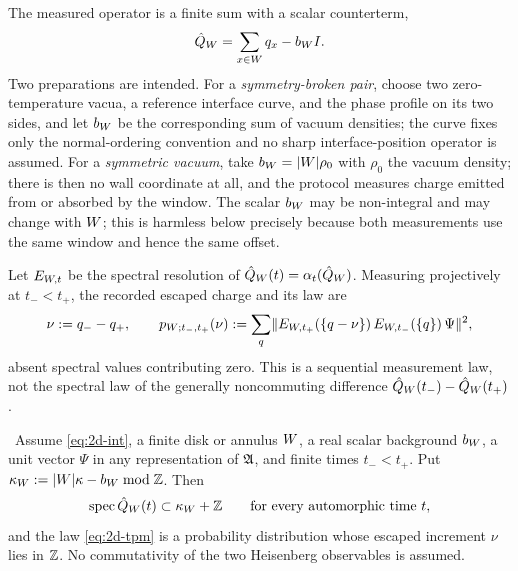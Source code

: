 \begin{definition}
The measured operator is a finite sum with a scalar counterterm,
\begin{equation}
  \hat{Q}_{W}=\sum_{x\in W}q_x-b_{W}I .
  \label{eq:2d-window-charge}
\end{equation}
Two preparations are intended. For a \emph{symmetry-broken pair}, choose two
zero-temperature vacua, a reference interface curve, and the phase profile on
its two sides, and let $b_W$ be the corresponding sum of vacuum
densities; the curve fixes only the normal-ordering convention and no sharp
interface-position operator is assumed. For a \emph{symmetric vacuum}, take
$b_W=\lvert W\rvert\rho_0$ with $\rho_0$ the vacuum density; there is then
no wall coordinate at all, and the protocol measures charge emitted from or
absorbed by the window. The scalar $b_W$ may be non-integral and may
change with $W$; this is harmless below precisely because both
measurements use the same window and hence the same offset.

Let $E_{W,t}$ be the spectral resolution of
$\hat{Q}_W(t)=\alpha_t(\hat{Q}_W)$. Measuring projectively at
$t_-<t_+$, the recorded escaped charge and its law are
\begin{equation}
  \nu:=q_--q_+,
  \qquad
  p_{W;t_-,t_+}(\nu)
   :=\sum_q\lVert E_{W,t_+}(\{q-\nu\})\,E_{W,t_-}(\{q\})\,\Psi\rVert^{2},
  \label{eq:2d-tpm}
\end{equation}
absent spectral values contributing zero. This is a sequential measurement
law, not the spectral law of the generally noncommuting difference
$\hat{Q}_W(t_-)-\hat{Q}_W(t_+)$.
\end{definition}


\begin{theorem}%
\label{thm:memory-2d-finite}
\statusProved\ Assume \eqref{eq:2d-int}, a finite disk or annulus $W$, a
real scalar background $b_W$, a unit vector $\Psi$ in any representation
of $\mathfrak{A}$, and finite times $t_-<t_+$. Put
$\kappa_W:=\lvert W\rvert\kappa-b_W \bmod \mathbb{Z}$. Then
\begin{equation}
  \operatorname{spec}\hat{Q}_W(t)\subset\kappa_W+\mathbb{Z}
  \qquad\text{for every automorphic time }t,
  \label{eq:2d-coset}
\end{equation}
and the law \eqref{eq:2d-tpm} is a probability distribution whose escaped
increment $\nu$ lies in $\mathbb{Z}$. No commutativity of the two Heisenberg
observables is assumed.
\end{theorem}

